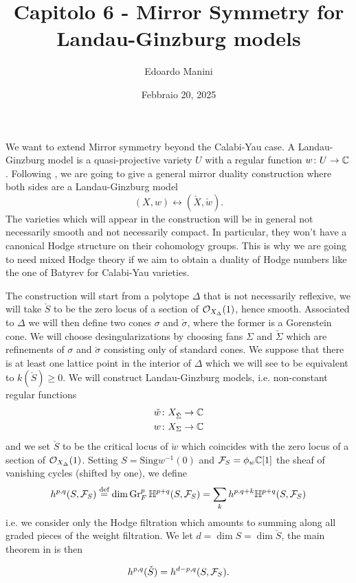 \documentclass[../main.tex]{subfiles}
\title{Capitolo 6 - Mirror Symmetry for Landau-Ginzburg models}
\author{Edoardo Manini}
\date{Febbraio 20, 2025}
\begin{document}
\ifSubfilesClassLoaded{
\maketitle
\tableofcontents
}{}


We want to extend Mirror symmetry beyond the Calabi-Yau case. 
A Landau-Ginzburg model is a quasi-projective variety $U$ with a regular function $w \colon U \to \mathbb{C}$.
Following \cite{GKR17}, we are going to give a general mirror duality construction where both sides are a Landau-Ginzburg model
\[
(X,w) \longleftrightarrow  (\check{X} , \check{w}) .
\]
The varieties which will appear in the construction will be in general not necessarily smooth and not necessarily compact. In particular, they won't have a canonical Hodge structure on their cohomology groups. This is why we are going to need mixed Hodge theory if we aim to obtain a duality of Hodge numbers like the one of Batyrev for Calabi-Yau varieties.


The construction will start from a polytope $\Delta$ that is not necessarily reflexive, we will take $\check{S}$ to be the zero locus of a section of $\mathcal{O}_{X_\Delta}(1)$, hence smooth. Associated to $\Delta$ we will then define two cones $\sigma$ and $\check{\sigma}$, where the former is a Gorenstein cone. We will choose desingularizations by choosing fans $\Sigma$ and $\check{\Sigma}$ which are refinements of $\sigma$ and $\check{\sigma}$ consisting only of standard cones.
We suppose that there is at least one lattice point in the interior of $\Delta$ which we will see to be equivalent to $k(\check{S})\geq 0$.
We will construct Landau-Ginzburg models, i.e. non-constant regular functions
\begin{align*}
\check{w} \colon X_{\check{\Sigma}} \to \mathbb{C} \\ 
w \colon X_\Sigma \to \mathbb{C}
\end{align*}
and we set $\check{S}$ to be the critical locus of $\check{w}$ which coincides with the zero locus of a section of $\mathcal{O}_{X_\Delta}(1)$.
Setting $S=\mathrm{Sing} w^{-1}(0)$ and $\mathcal{F}_S=\phi_w \mathbb{C}[1]$ the sheaf of vanishing cycles (shifted by one), we define
\[
h^{p,q}(S, \mathcal{F}_S) \stackrel{\text{def}}{=} \dim \operatorname{Gr}^p_F \mathbb{H}^{p+q}(S, \mathcal{F}_S) = \sum_k h^{p,q+k} \mathbb{H}^{p+q}(S,\mathcal{F}_S)
\] 
i.e. we consider only the Hodge filtration which amounts to summing along all graded pieces of the weight filtration.
We let $d = \dim S = \dim \check{S}$, the main theorem in \cite{GKR17} is then
\begin{theorem} \textup{\cite[Thm. 5.11]{GKR17}} \label{SScheck}
    \[
    h^{p,q}(\check{S}) = h^{d-p,q}(S, \mathcal{F}_S).
\]
\end{theorem}
\end{document}
